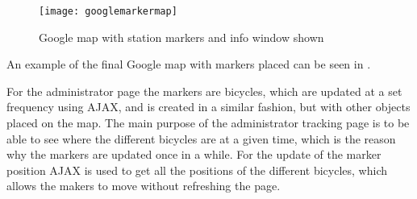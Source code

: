 \begin{figure}[h]
	\centering
	\texttt{[image: googlemarkermap]}
	\caption{Google map with station markers and info window shown}
	\label{fig:googlemapmarkerinfowindow}
\end{figure}

An example of the final Google map with markers placed can be seen in .

For the administrator page the markers are bicycles, which are updated at a set frequency using AJAX, and is created in a similar fashion, but with other objects placed on the map.
The main purpose of the administrator tracking page is to be able to see where the different bicycles are at a given time, which is the reason why the markers are updated once in a while.
For the update of the marker position AJAX is used to get all the positions of the different bicycles, which allows the makers to move without refreshing the page.